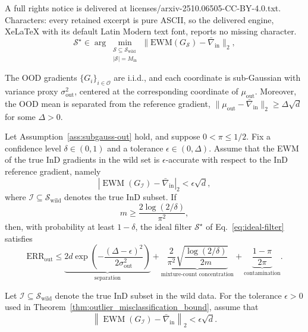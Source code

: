 \documentclass[10pt,a4paper]{amsart}
\begin{document}
A full rights notice is delivered at licenses/arxiv-2510.06505-CC-BY-4.0.txt. Characters: every retained excerpt is pure ASCII, so the delivered engine, XeLaTeX with its default Latin Modern text font, reports no missing character.
\begin{equation}
  \mathcal{S}^\star \in \arg\min_{\substack{\mathcal{S} \subseteq \mathcal{S}_{\mathrm{wild}} \\ |\mathcal{S}| = M_{\mathrm{in}}}}
  \big\| \mathrm{EWM}(G_\mathcal{S}) - \bar{\nabla}_{\mathrm{in}} \big\|_2 ,
  \label{eq:ideal-filter}
\end{equation}

\begin{assumption}
\label{ass:subgauss-out}
The OOD gradients $\{G_i\}_{i \in \mathcal{O}}$ are i.i.d., and each coordinate is
sub-Gaussian with variance proxy $\sigma_{\mathrm{out}}^2$, centered at the corresponding
coordinate of $\mu_{\mathrm{out}}$. Moreover, the OOD mean is separated from the reference
gradient, $\big\| \mu_{\mathrm{out}} - \bar{\nabla}_{\mathrm{in}} \big\|_2 \geq
\Delta\sqrt{d}$ for some $\Delta > 0$.
\end{assumption}

\begin{theorem}
\label{thm:outlier_misclassification_bound}
Let Assumption~\ref{ass:subgauss-out} hold, and suppose \(0<\pi\leq 1/2\).
Fix a confidence level \(\delta\in(0,1)\) and a tolerance \(\epsilon\in(0,\Delta)\).
Assume that the EWM of the true InD gradients in the wild set is \(\epsilon\)-accurate
with respect to the InD reference gradient, namely
\[
\left|
\operatorname{EWM}(G_{\mathcal I})-\bar{\nabla}_{\mathrm{in}}
\right|_2
<
\epsilon\sqrt{d},
\]
where \(\mathcal I\subseteq\mathcal S_{\mathrm{wild}}\) denotes the true InD subset.
If
\[
m \geq \frac{2\log(2/\delta)}{\pi^2},
\]
then, with probability at least \(1-\delta\), the ideal filter
\(\mathcal{S}^\star\) of Eq.~\ref{eq:ideal-filter} satisfies
\[
\mathrm{ERR}_{\mathrm{out}}
\leq
\underbrace{2d\exp\left(-\frac{(\Delta-\epsilon)^2}{2\sigma_{\mathrm{out}}^2}\right)}_{\text{separation}}
+
\underbrace{
\frac{2}{\pi^2}\sqrt{\frac{\log(2/\delta)}{2m}}
}_{\text{mixture-count concentration}}
+
\underbrace{\frac{1-\pi}{2\pi}}_{\text{contamination}}.
\]

\end{theorem}

\begin{assumption}
\label{assump:reference_ewm_accuracy}
Let \(\mathcal{I}\subseteq\mathcal{S}_{\mathrm{wild}}\) denote the true InD subset in the wild data. For the tolerance \(\epsilon>0\) used in Theorem~\ref{thm:outlier_misclassification_bound}, assume that
\begin{equation*}
\left\|
\operatorname{EWM}\left(G_{\mathcal{I}}\right)
-
\bar{\nabla}_{\mathrm{in}}
\right\|_2
<
\epsilon\sqrt{d}.
\end{equation*}
\end{assumption}
\end{document}
